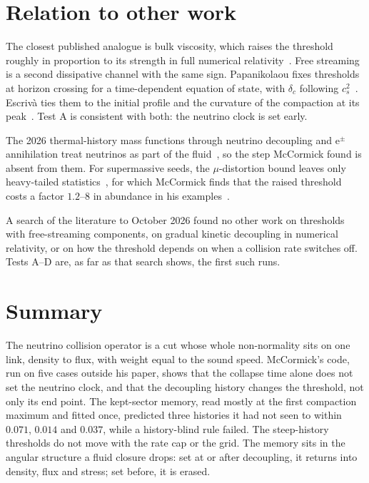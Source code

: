 \documentclass[11pt]{article}
\begin{document}
\section{Relation to other work}

The closest published analogue is bulk viscosity, which raises the threshold roughly in proportion to its strength in full numerical relativity~\cite{Yuwen}. Free streaming is a second dissipative channel with the same sign. Papanikolaou fixes thresholds at horizon crossing for a time-dependent equation of state, with $\delta_c$ following $c_s^2$~\cite{Pap}. Escriv\`a ties them to the initial profile and the curvature of the compaction at its peak~\cite{Esc}. Test A is consistent with both: the neutrino clock is set early.

The 2026 thermal-history mass functions through neutrino decoupling and e$^\pm$ annihilation treat neutrinos as part of the fluid~\cite{Gonin}, so the step McCormick found is absent from them. For supermassive seeds, the $\mu$-distortion bound leaves only heavy-tailed statistics~\cite{Dave}, for which McCormick finds that the raised threshold costs a factor $1.2$--$8$ in abundance in his examples~\cite{McC}.

A search of the literature to October 2026 found no other work on thresholds with free-streaming components, on gradual kinetic decoupling in numerical relativity, or on how the threshold depends on when a collision rate switches off. Tests A--D are, as far as that search shows, the first such runs.

\section{Summary}

The neutrino collision operator is a cut whose whole non-normality sits on one link, density to flux, with weight equal to the sound speed. McCormick's code, run on five cases outside his paper, shows that the collapse time alone does not set the neutrino clock, and that the decoupling history changes the threshold, not only its end point. The kept-sector memory, read mostly at the first compaction maximum and fitted once, predicted three histories it had not seen to within $0.071$, $0.014$ and $0.037$, while a history-blind rule failed. The steep-history thresholds do not move with the rate cap or the grid. The memory sits in the angular structure a fluid closure drops: set at or after decoupling, it returns into density, flux and stress; set before, it is erased.
\end{document}
